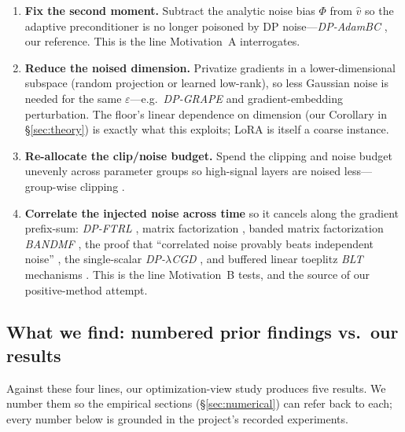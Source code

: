 \documentclass[11pt]{article}
\theoremstyle{plain}
\theoremstyle{definition}
\theoremstyle{remark}
\begin{document}
\begin{enumerate}[leftmargin=2em,itemsep=2pt,topsep=2pt]
\item \textbf{Fix the second moment.} Subtract the analytic noise bias $\Phi$ from $\hat v$ so the
adaptive preconditioner is no longer poisoned by DP noise---\emph{DP-AdamBC}
\citep{tang2024dpadambc}, our reference. This is the line Motivation~A interrogates.

\item \textbf{Reduce the noised dimension.} Privatize gradients in a lower-dimensional subspace
(random projection or learned low-rank), so less Gaussian noise is needed for the same
$\varepsilon$---e.g.\ \emph{DP-GRAPE} \citep{dpgrape2025} and gradient-embedding perturbation. The
floor's linear dependence on dimension (our Corollary in \S\ref{sec:theory}) is exactly what this
exploits; LoRA is itself a coarse instance.

\item \textbf{Re-allocate the clip/noise budget.} Spend the clipping and noise budget unevenly
across parameter groups so high-signal layers are noised less---group-wise clipping
\citep{he2023groupclip}.

\item \textbf{Correlate the injected noise across time} so it cancels along the gradient prefix-sum:
\emph{DP-FTRL} \citep{kairouz2021dpftrl}, matrix factorization \citep{denisov2022mf},
banded matrix factorization \emph{BANDMF} \citep{choquettechoo2023bandmf}, the proof that
``correlated noise provably beats independent noise'' \citep{choquettechoo2024correlated}, the
single-scalar \emph{DP-$\lambda$CGD} \citep{dplcgd2026}, and buffered linear toeplitz \emph{BLT}
mechanisms \citep{blt2024}. This is the line Motivation~B tests, and the source of our positive-method
attempt.
\end{enumerate}

\subsection*{What we find: numbered prior findings vs.\ our results}

Against these four lines, our optimization-view study produces five results. We number them so the
empirical sections (\S\ref{sec:numerical}) can refer back to each; every number below is grounded in the
project's recorded experiments.
\end{document}
